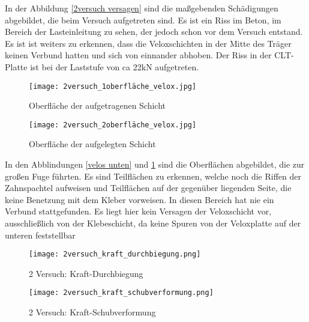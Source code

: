 \documentclass[12 pt,a4 paper ]{scrreprt}
\begin{document}
In der Abbildung \ref{2versuch versagen} sind die maßgebenden Schädigungen abgebildet, die beim Versuch aufgetreten sind. Es ist ein Riss im Beton, im Bereich der Lasteinleitung zu sehen, der jedoch schon vor dem Versuch entstand. Es ist ist weiters zu erkennen, dass die Veloxschichten in der Mitte des Träger keinen Verbund hatten und sich von einnander abhoben. Der Riss in der CLT-Platte ist bei der Laststufe von ca 22kN aufgetreten. \\

\begin{figure}[h]
\begin{minipage}[hbt]{7cm}	
	\texttt{[image: 2versuch\_1oberfläche\_velox.jpg]}
	\caption{Oberfläche der aufgetragenen Schicht}
	\label{velos unten}
\end{minipage}
\hfill
\begin{minipage}[hbt]{7cm}
	\texttt{[image: 2versuch\_2oberfläche\_velox.jpg]}
	\caption{Oberfläche der aufgelegten Schicht}
	\label{velox ober}
\end{minipage}
\end{figure}

In den Abblindungen \ref{velos unten} und \ref{velox ober} sind die Oberflächen abgebildet, die zur großen Fuge führten. Es sind Teilflächen zu erkennen, welche noch die Riffen der Zahnspachtel aufweisen und Teilflächen auf der gegenüber liegenden Seite, die keine Benetzung mit dem Kleber vorweisen. In diesen Bereich hat nie ein Verbund stattgefunden. Es liegt hier kein Versagen der Veloxschicht vor, ausschließlich von der Klebeschicht, da keine Spuren von der Veloxplatte auf der unteren feststellbar  


\begin{figure}
\begin{center}
\texttt{[image: 2versuch\_kraft\_durchbiegung.png]}
\caption{2 Versuch: Kraft-Durchbiegung}
\label{2 Versuch: Kraft-Durchbiegung}
\end{center}
\end{figure}



\begin{figure}
\begin{center}
\texttt{[image: 2versuch\_kraft\_schubverformung.png]}
\caption{2 Versuch: Kraft-Schubverformung}
\label{2_versuch_kraft_schubverschiebung}
\end{center}
\end{figure}
\end{document}
